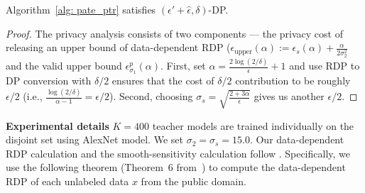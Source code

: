 \begin{theorem}
Algorithm~\ref{alg: pate_ptr} satisfies $(\epsilon'+\hat{\epsilon}, \delta)$-DP.
\end{theorem}

\begin{proof}
The privacy analysis consists of two components --- the privacy cost of releasing an upper bound of data-dependent RDP ($\epsilon_{\text{upper}}(\alpha):=\epsilon_s(\alpha)+\frac{\alpha}{2\sigma_2^2}$ and the valid upper bound $\epsilon_{\sigma_1}^p(\alpha)$.
First, set $\alpha =\frac{2\log(2/\delta)}{\epsilon}+1$ and use RDP to DP conversion with $\delta/2$ ensures that the cost of $\delta/2$ contribution to be roughly $\epsilon/2$ (i.e., $\frac{\log(2/\delta)}{\alpha-1} = \epsilon/2$). Second,  choosing $\sigma_s = \sqrt{\frac{2+3\alpha}{\epsilon}}$ gives us another $\epsilon/2$. 
\end{proof}


\textbf{Experimental details}
 $K=400$ teacher models are trained individually on the disjoint set using AlexNet model. We set $\sigma_2 = \sigma_s = 15.0$.   Our data-dependent RDP calculation and the smooth-sensitivity calculation follow \citet{papernot2018scalable}. Specifically, we use the following theorem (Theorem~6 from~\citet{papernot2018scalable}) to compute the data-dependent RDP of each unlabeled data $x$ from the public domain.


